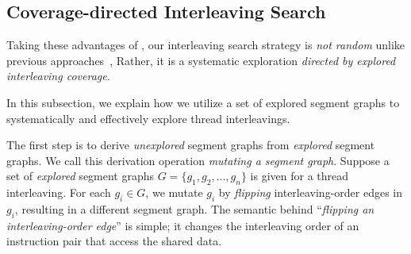 


\subsection{Coverage-directed Interleaving Search}
\label{ss:scheduler}

Taking these advantages of \intcov, our interleaving search strategy
is \textit{not random} unlike previous approaches~\cite{krace, ski,
  pctalgorithm, muzz}, Rather, it is a systematic exploration
\textit{directed by explored interleaving coverage}.
%



%
In this subsection, we explain how we utilize a set of explored
segment graphs to systematically and effectively explore thread
interleavings.



%
The first step is to derive \textit{unexplored} segment graphs from
\textit{explored} segment graphs. We call this derivation operation
\textit{mutating a segment graph}.
%
Suppose a set of \textit{explored} segment graphs
$G = \{g_1, g_2, ..., g_n \}$ is given for a thread interleaving.
%
For each $g_i \in G$, we mutate $g_i$ by \textit{flipping}
interleaving-order edges in $g_i$, resulting in a different segment
graph.
%
The semantic behind ``\textit{flipping an interleaving-order edge}''
is simple; it changes the interleaving order of an instruction pair
that access the shared data.




